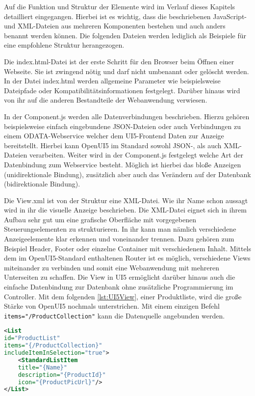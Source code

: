 Auf die Funktion und Struktur der Elemente wird im Verlauf dieses Kapitels detailliert eingegangen. Hierbei ist es wichtig, dass die beschriebenen JavaScript- und XML-Dateien aus mehreren Komponenten bestehen und auch anders benannt werden können. Die folgenden Dateien werden lediglich als Beispiele für eine empfohlene Struktur herangezogen. 

Die index.html-Datei ist der erste Schritt für den Browser beim Öffnen einer Webseite. Sie ist zwingend nötig und darf nicht umbenannt oder gelöscht werden. In der Datei index.html werden allgemeine Parameter wie beispielsweise Dateipfade oder Kompatibilitätsinformationen festgelegt. Darüber hinaus wird von ihr auf die anderen Bestandteile der Webanwendung verwiesen.

In der Component.js werden alle Datenverbindungen beschrieben. Hierzu gehören beispielsweise einfach eingebundene JSON-Dateien oder auch Verbindungen zu einem ODATA-Webservice welcher dem UI5-Frontend Daten zur Anzeige bereitstellt. Hierbei kann OpenUI5 im Standard sowohl JSON-, als auch XML-Dateien verarbeiten. Weiter wird in der Component.js festgelegt welche Art der Datenbindung zum Webservice besteht. Möglich ist hierbei das bloße Anzeigen (unidirektionale Bindung), zusätzlich aber auch das Verändern auf der Datenbank (bidirektionale Bindung).

Die View.xml ist von der Struktur eine XML-Datei. Wie ihr Name schon aussagt wird in ihr die visuelle Anzeige beschrieben. Die XML-Datei eignet sich in ihrem Aufbau sehr gut um eine grafische Oberfläche mit vorgegebenen Steuerungselementen zu strukturieren. In ihr kann man nämlich verschiedene Anzeigeelemente klar erkennen und voneinander trennen. Dazu gehören zum Beispiel Header, Footer oder einzelne Container mit verschiedenem Inhalt. Mittels dem im OpenUI5-Standard enthaltenen Router ist es möglich, verschiedene Views miteinander zu verbinden und somit eine Webanwendung mit mehreren Unterseiten zu schaffen. Die View in UI5 ermöglicht darüber hinaus auch die einfache Datenbindung zur Datenbank ohne zusätzliche Programmierung im Controller. Mit dem folgenden \autoref{lst:UI5View}, einer Produktliste, wird die große Stärke von OpenUI5 nochmals unterstrichen. Mit einem einzigen Befehl \texttt{items="{/ProductCollection}"} kann die Datenquelle angebunden werden.


\begin{lstlisting}[caption=Beispiel OpenUI5 View, label=lst:UI5View, language=XML]
<List
id="ProductList"
items="{/ProductCollection}"
includeItemInSelection="true">
	<StandardListItem
	title="{Name}"
	description="{ProductId}"
	icon="{ProductPicUrl}"/>
</List>
\end{lstlisting}

